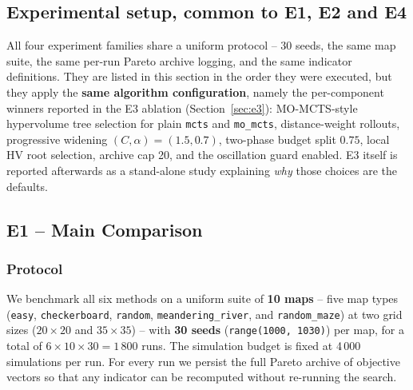 
\subsection*{Experimental setup, common to E1, E2 and E4}

All four experiment families share a uniform protocol -- 30 seeds, the same map suite, the same per-run Pareto archive logging, and the same indicator definitions. They are listed in this section in the order they were executed, but they apply the \textbf{same algorithm configuration}, namely the per-component winners reported in the E3 ablation (Section~\ref{sec:e3}): MO-MCTS-style hypervolume tree selection for plain \texttt{mcts} and \texttt{mo\_mcts}, distance-weight rollouts, progressive widening $(C, \alpha) = (1.5, 0.7)$, two-phase budget split $0.75$, local HV root selection, archive cap 20, and the oscillation guard enabled. E3 itself is reported afterwards as a stand-alone study explaining \emph{why} those choices are the defaults.

\subsection{E1 -- Main Comparison}

\subsubsection{Protocol}
We benchmark all six methods on a uniform suite of \textbf{10 maps} -- five map types
(\texttt{easy}, \texttt{checkerboard}, \texttt{random}, \texttt{meandering\_river}, and \texttt{random\_maze})
at two grid sizes ($20\times 20$ and $35\times 35$) -- with \textbf{30 seeds} (\texttt{range(1000, 1030)}) per map, for a total of $6 \times 10 \times 30 = 1\,800$ runs. The simulation budget is fixed at 4\,000 simulations per run. For every run we persist the full Pareto archive of objective vectors so that any indicator can be recomputed without re-running the search.

